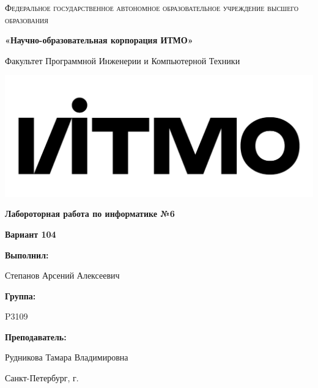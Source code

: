 \begin{titlepage}
    \fontsize{9}{11}
	\centering
	{
        \scshape
        Федеральное государственное автономное образовательное учреждение высшего образования
        \par
        \textbf{«Научно-образовательная корпорация ИТМО»}
        \par
        \vspace*{1cm}
        Факультет Программной Инженерии и Компьютерной Техники
        \par
    }
    \vspace*{0.6cm}
    \includegraphics[width=\textwidth]{logo.png}
    {
        \Large
        \textbf{Лабороторная работа по информатике №6}
        \par
        \normalsize
        \vspace*{0.75cm}
        \textbf{Вариант 104}
        \par
    }
    \vfill
    \hfill\begin{minipage}{\dimexpr\textwidth-7.8cm}
        \textbf{Выполнил:}\par
        Степанов Арсений Алексеевич\par
        \vspace*{0.15cm}
        \textbf{Группа:}\par
        P3109\par
        \vspace*{0.15cm}
        \textbf{Преподаватель:}\par
        Рудникова Тамара Владимировна\par
    \end{minipage}
    \vfill
    Санкт-Петербург, \the\year{}г.
\end{titlepage}